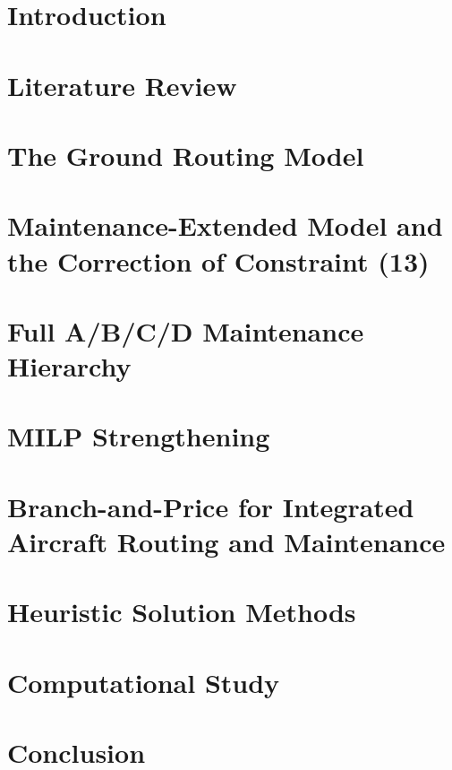\documentclass[12pt,a4paper]{report}
\begin{document}
\tableofcontents
\listoffigures
\listoftables

\cleardoublepage
{}

\chapter{Introduction}
\label{ch:introduction}


\chapter{Literature Review}
\label{ch:lit}


\chapter{The Ground Routing Model}
\label{ch:ground}


\chapter{Maintenance-Extended Model and the Correction of Constraint (13)}
\label{ch:maintenance}


\chapter{Full A/B/C/D Maintenance Hierarchy}
\label{ch:hierarchy}


\chapter{MILP Strengthening}


\chapter{Branch-and-Price for Integrated Aircraft Routing and Maintenance}
\label{ch:branch_price}


\chapter{Heuristic Solution Methods}
\label{ch:heuristics}


\chapter{Computational Study}
\label{ch:experiments}


\chapter{Conclusion}
\label{ch:conclusion}




\end{document}
